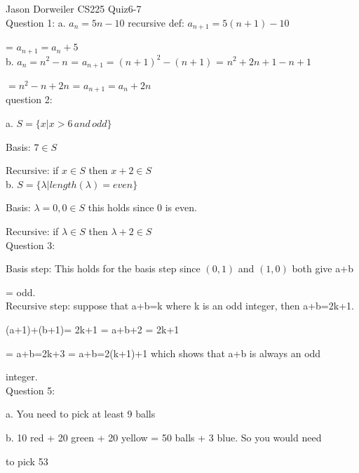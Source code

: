 \documentclass[10pt,a4paper]{report}
\begin{document}
Jason Dorweiler CS225 Quiz6-7\\

Question 1:
a. $a_n = 5n-10$ recursive def: $a_{n+1} = 5(n+1)-10$ 

= $a_{n+1} = a_n+5$ \\

b. $a_n = n^2 -n$  = $a_{n+1} = (n+1)^2-(n+1)$ = $n^2+2n+1-n+1 $

$= n^2-n+2n$ = $a_{n+1} = a_n + 2n$\\

question 2:

a. $S = \{x | x > 6 \,and\, odd\}$

Basis: $7 \in S$

Recursive: if $x \in S$ then $x+2 \in S$\\

b. $S = \{ \lambda | length(\lambda) = even\}$ 

Basis: $\lambda = 0 ,0 \in S$ this holds since 0 is even.

Recursive: if $\lambda \in S$ then $\lambda +2 \in S$\\

Question 3:

Basis step: This holds for the basis step since $(0,1)$ and $(1,0)$ both give a+b 

= odd.\\

Recursive step: 
suppose that a+b=k where k is an odd integer, then a+b=2k+1. 

 (a+1)+(b+1)= 2k+1 = a+b+2 = 2k+1 

= a+b=2k+3 = a+b=2(k+1)+1 which shows that a+b is always an odd 

integer. \\


Question 5:

a. You need to pick at least 9 balls

b. 10 red + 20 green + 20 yellow = 50 balls + 3 blue.  So you would need 

to pick 53
\end{document}
